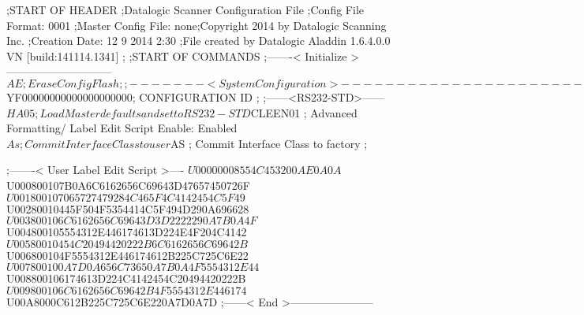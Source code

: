 ;START OF HEADER
;Datalogic Scanner Configuration File
;Config File Format: 0001
;Master Config File: none;Copyright 2014 by Datalogic Scanning Inc.
;Creation Date: 12 9 2014 2:30
;File created by Datalogic Aladdin 1.6.4.0.0 VN [build:141114.1341]
;
;START OF COMMANDS
;-------< Initialize >-----------------------------
$AE                 ; Erase Config Flash
;
;-------< System Configuration >-------------------------------
$YF00000000000000000000; CONFIGURATION ID
;
;------<RS232-STD>------
$HA05              ; Load Master defaults and set to RS232-STD
$CLEEN01            ; Advanced Formatting/ Label Edit Script Enable: Enabled
$As                 ; Commit Interface Class to user
$AS                 ; Commit Interface Class to factory
;

;-------< User Label Edit Script >----
$U00000008554C453200AE0A0A
$U000800107B0A6C6162656C69643D47657450726F
$U001800107065727479284C465F4C4142454C5F49
$U00280010445F504F5354414C5F494D290A696628
$U003800106C6162656C69643D3D2222290A7B0A4F
$U004800105554312E446174613D224E4F204C4142
$U00580010454C20494420222B6C6162656C69642B
$U006800104F5554312E446174612B225C725C6E22
$U007800100A7D0A656C73650A7B0A4F5554312E44
$U008800106174613D224C4142454C20494420222B
$U009800106C6162656C69642B4F5554312E446174
$U00A8000C612B225C725C6E220A7D0A7D
;------< End >-----------------------
